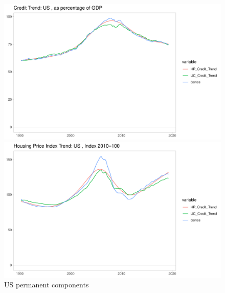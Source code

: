 \documentclass[fleqn]{article}
\begin{document}
\begin{outline}[enumerate]
\begin{figure}[h!]
\caption{US permanent components}	
\centerline{\includegraphics[scale=0.7]{../Output/Graphs/Credit_trend_US.pdf}}
\centerline{\includegraphics[scale=0.7]{../Output/Graphs/HP_trend_US.pdf}}
\end{figure}


\end{outline}
\end{document}
